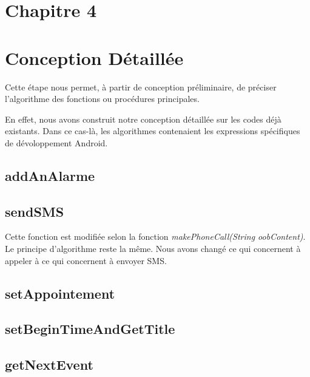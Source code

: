 \section*{Chapitre 4}
\section{Conception Détaillée}
\indent Cette étape nous permet, à partir de conception préliminaire, de préciser l'algorithme des fonctions ou procédures principales.

\indent En effet, nous avons construit notre conception détaillée sur les codes déjà existants. Dans ce cas-là, les algorithmes contenaient les expressions spécifiques de dévoloppement Android.

\subsection{addAnAlarme}
	

\subsection{sendSMS}
	

	Cette fonction est modifiée selon la fonction \emph{makePhoneCall(String oobContent)}. Le principe d'algorithme reste la même. Nous avons changé ce qui concernent à appeler à ce qui concernent à envoyer SMS.

\subsection{setAppointement}
	
\newpage
\subsection{setBeginTimeAndGetTitle}
	
\newpage
\subsection{getNextEvent}
	

\newpage
